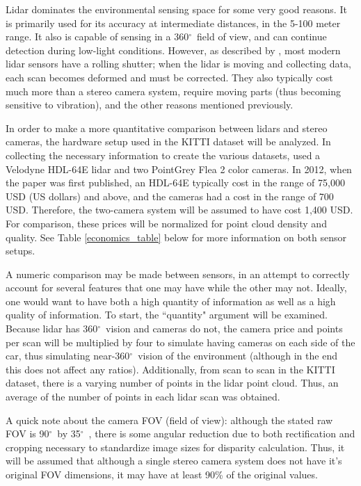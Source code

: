 \def \deg {$ ^{\circ}$\ } %
Lidar dominates the environmental sensing space for some very good reasons. It is primarily used for its accuracy at intermediate distances, in the 5-100 meter range. It also is capable of sensing in a 360\deg field of view, and can continue detection during low-light conditions. However, as described by \cite{broggi_sensors_2013}, most modern lidar sensors have a rolling shutter; when the lidar is moving and collecting data, each scan becomes deformed and must be corrected. They also typically cost much more than a stereo camera system, require moving parts (thus becoming sensitive to vibration), and the other reasons mentioned previously.

In order to make a more quantitative comparison between lidars and stereo cameras, the hardware setup used in the KITTI dataset will be analyzed. In collecting the necessary information to create the various datasets, \cite{geiger_are_2012} used a Velodyne HDL-64E lidar and two PointGrey Flea 2 color cameras. In 2012, when the paper was first published, an HDL-64E typically cost in the range of 75,000 USD (US dollars) and above, and the cameras had a cost in the range of 700 USD. Therefore, the two-camera system will be assumed to have cost 1,400 USD. For comparison, these prices will be normalized for point cloud density and quality. See Table \ref{economics_table} below for more information on both sensor setups.

A numeric comparison may be made between sensors, in an attempt to correctly account for several features that one may have while the other may not. Ideally, one would want to have both a high quantity of information as well as a high quality of information. To start, the ``quantity" argument will be examined. Because lidar has 360\deg vision and cameras do not, the camera price and points per scan will be multiplied by four to simulate having cameras on each side of the car, thus simulating near-360\deg vision of the environment (although in the end this does not affect any ratios). Additionally, from scan to scan in the KITTI dataset, there is a varying number of points in the lidar point cloud. Thus, an average of the number of points in each lidar scan was obtained.

A quick note about the camera FOV (field of view): although the stated raw FOV is 90\deg by 35\deg, there is some angular reduction due to both rectification and cropping necessary to standardize image sizes for disparity calculation. Thus, it will be assumed that although a single stereo camera system does not have it's original FOV dimensions, it may have at least 90\% of the original values.

